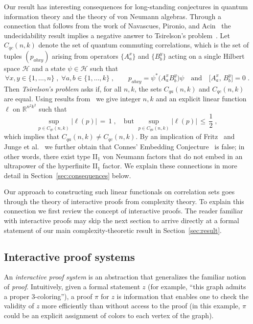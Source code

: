 \documentclass[11pt]{article}
\theoremstyle{definition}
\newcommand{\R}{\ensuremath{\mathbb{R}}}
\newcommand{\mH}{\ensuremath{\mathcal{H}}}
\begin{document}
Our result has interesting consequences for long-standing conjectures in quantum information theory and the theory of von Neumann algebras. Through a connection that follows from the work of Navascues, Pironio, and Acin~\cite{navascues2008convergent} the undecidability result implies a negative answer to Tsirelson's problem~\cite{Tsi06}. Let $C_{qc}(n,k)$ denote the set of quantum commuting correlations, which is the set of tuples $(p_{abxy})$ arising from operators $\{A^x_a\}$ and $\{B^y_b\}$ acting on a single Hilbert space $\mH$ and a state $\psi \in \mH$ such that
\begin{equation}\label{eq:intro-qc}
 \forall x,y\in \{1,\ldots,n\}\;,\;\forall a,b\in\{1,\ldots,k\}\;,\qquad p_{abxy} = \psi^* \big( A^x_a B^y_b\big) \psi \quad\text{and}\quad  \big[A^x_a,\,B^y_b\big]=0\;.
\end{equation}
Then \emph{Tsirelson's problem} asks if, for all $n,k$, the sets $C_{qa}(n,k)$ and $C_{qc}(n,k)$ are equal. 
Using results from~\cite{navascues2008convergent} we give integer $n,k$ and an explicit linear function $\ell$ on $\R^{n^2k^2}$ such that 
\[ \sup_{p\in C_{qc}(n,k)} \big|\ell(p)\big| \,=\,1\;,\quad\text{but}\,\, \sup_{p\in C_{qa}(n,k)} \big|\ell(p)\big| \,\leq\,\frac{1}{2}\;,\]
which implies that $C_{qa}(n,k)\neq C_{qc}(n,k)$. 
By an implication of Fritz~\cite{fritz2012tsirelson} and Junge et al.~\cite{junge2011connes} we further obtain that Connes' Embedding Conjecture~\cite{connes1976classification} is false; in other words, there exist type II$_1$ von Neumann factors that do not embed in an ultrapower of the hyperfinite II$_1$ factor. We explain these connections in more detail in Section~\ref{sec:consequences} below.

Our approach to constructing such linear functionals on correlation sets goes through the theory of 
interactive proofs from complexity theory. 
To explain this connection we first review the concept of interactive proofs. The reader familiar with interactive proofs may skip the next section to arrive directly at a formal statement of our main complexity-theoretic result in Section~\ref{sec:result}. 

\subsection{Interactive proof systems}
An \emph{interactive proof system} is an abstraction that generalizes the familiar notion of \emph{proof}. Intuitively, given a formal statement $z$ (for example, ``this graph admits a proper $3$-coloring''), a proof $\pi$ for $z$ is information that enables one to check the validity of $z$ more efficiently than without access to the proof (in this example, $\pi$ could be an explicit assignment of colors to each vertex of the graph). 
\end{document}
